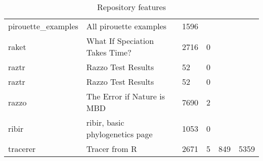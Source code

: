 \begin{table}[ht]
\begin{tabular}{p{}p{}p{}p{}p{}p{}}
  pirouette\_examples & All pirouette examples & 1596 &  &  &  \\ 
  raket & What If Speciation Takes Time? & 2716 &   0 &  &  \\ 
  raztr & Razzo Test Results &  52 &   0 &  &  \\ 
  raztr & Razzo Test Results &  52 &   0 &  &  \\ 
  razzo & The Error if Nature is MBD & 7690 &   2 &  &  \\ 
  ribir & ribir, basic phylogenetics page & 1053 &   0 &  &  \\ 
  tracerer & Tracer from R & 2671 &   5 & 849 & 5359 \\ 
   \hline
\end{tabular}
\caption{Repository features} 
\label{tab:repos}
\end{table}
